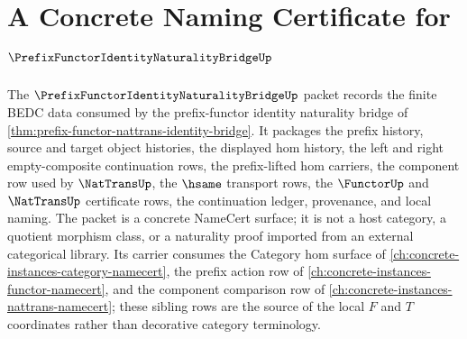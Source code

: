 \chapter{A Concrete Naming Certificate for $\PrefixFunctorIdentityNaturalityBridgeUp$}
\label{ch:concrete-instances-prefixfunctoridentitynaturalitybridge-namecert}

The $\PrefixFunctorIdentityNaturalityBridgeUp$ packet records the finite BEDC data consumed by the prefix-functor identity naturality bridge of \autoref{thm:prefix-functor-nattrans-identity-bridge}. It packages the prefix history, source and target object histories, the displayed hom history, the left and right empty-composite continuation rows, the prefix-lifted hom carriers, the component row used by $\NatTransUp$, the $\hsame$ transport rows, the $\FunctorUp$ and $\NatTransUp$ certificate rows, the continuation ledger, provenance, and local naming. The packet is a concrete NameCert surface; it is not a host category, a quotient morphism class, or a naturality proof imported from an external categorical library. Its carrier consumes the Category hom surface of \autoref{ch:concrete-instances-category-namecert}, the prefix action row of \autoref{ch:concrete-instances-functor-namecert}, and the component comparison row of \autoref{ch:concrete-instances-nattrans-namecert}; these sibling rows are the source of the local $F$ and $T$ coordinates rather than decorative category terminology.

